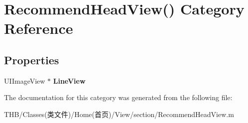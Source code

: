 \hypertarget{category_recommend_head_view_07_08}{}\section{Recommend\+Head\+View() Category Reference}
\label{category_recommend_head_view_07_08}
\subsection*{Properties}
\begin{DoxyCompactItemize}
\item 
\mbox{\label{category_recommend_head_view_07_08_a0127221fa1e58a78fd2826144f0591ff}} 
U\+I\+Image\+View $\ast$ {\bfseries Line\+View}
\end{DoxyCompactItemize}


The documentation for this category was generated from the following file\+:\begin{DoxyCompactItemize}
\item 
T\+H\+B/\+Classes(类文件)/\+Home(首页)/\+View/section/Recommend\+Head\+View.\+m\end{DoxyCompactItemize}
